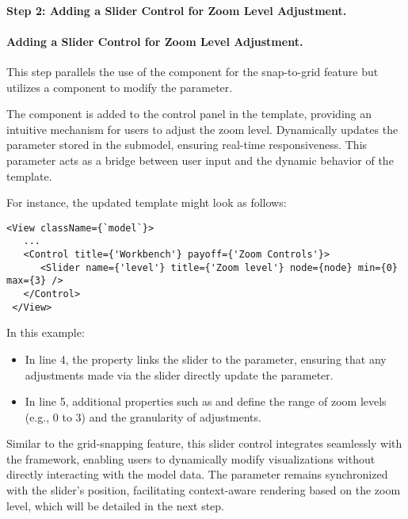 \paragraph{Step 2: Adding a Slider Control for Zoom Level Adjustment.} 


\paragraph{Adding a Slider Control for Zoom Level Adjustment.} This step parallels the use of the  component for the snap-to-grid feature but utilizes a  component to modify the  parameter.  

The component  is added to the control panel in the template, providing an intuitive mechanism for users to adjust the zoom level. Dynamically updates the  parameter stored in the  submodel, ensuring real-time responsiveness. This parameter acts as a bridge between user input and the dynamic behavior of the template.  

For instance, the updated template might look as follows:  

\begin{lstlisting}[language=JSX-template]  
 <View className={`model`}>  
   ...  
   <Control title={'Workbench'} payoff={'Zoom Controls'}>  
      <Slider name={'level'} title={'Zoom level'} node={node} min={0} max={3} />  
   </Control>  
 </View>    
\end{lstlisting}  

In this example:  
\begin{itemize}
    \item In line 4, the  property links the slider to the  parameter, ensuring that any adjustments made via the slider directly update the parameter. 
    \item In line 5, additional properties such as  and  define the range of zoom levels (e.g., 0 to 3) and the granularity of adjustments.  
\end{itemize}


Similar to the grid-snapping feature, this slider control integrates seamlessly with the \jjodel{} framework, enabling users to dynamically modify visualizations without directly interacting with the model data. The  parameter remains synchronized with the slider's position, facilitating context-aware rendering based on the zoom level, which will be detailed in the next step.  

